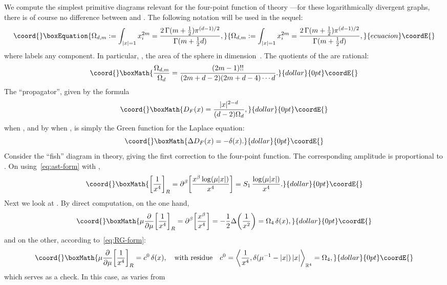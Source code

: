 \documentclass[a4paper,12pt]{article}
\renewcommand{\b}{\beta}           %
\providecommand{\Dl}{\Delta}           %
\providecommand{\del}{\partial}        %
\providecommand{\dl}{\delta}           %
\providecommand{\Ga}{\Gamma}           %
\providecommand{\R}{\mathbb{R}}        %
\providecommand{\thalf}{\tfrac{1}{2}}  %
\providecommand{\7}{\dagger}           %
\theoremstyle{plain}
\theoremstyle{definition}
\begin{document}
We compute the simplest primitive diagrams relevant for the four-point
function of \coordHE{} theory ---for these logarithmically divergent
graphs, there is of course no difference between \coordHE{} and \coordHE{}. The
following notation will be used in the sequel:
\begin{equation}\coord{}\boxEquation{
\Omega_{d,m} := \int_{|x|=1} x_i^{2m} =
\frac{2\,\Ga(m+\thalf)\pi^{(d-1)/2}}{\Ga(m+\thalf d)},
\label{eq:Om-eq}
}{
\Omega_{d,m} := \int_{|x|=1} x_i^{2m} =
\frac{2\,\Ga(m+\thalf)\pi^{(d-1)/2}}{\Ga(m+\thalf d)},
}{ecuacion}\coordE{}\end{equation}
where \coordHE{} labels any component. In particular,
\coordHE{}, the area of the sphere in dimension~\coordHE{}.
The quotients of the \coordHE{} are rational:
$$\coord{}\boxMath{
\frac{\Omega_{d,m}}{\Omega_d} =
\frac{(2m-1)!!}{(2m+d-2)(2m+d-4)\cdots d}.
}{dollar}{0pt}\coordE{}$$
The ``propagator'', given by the formula
$$\coord{}\boxMath{
D_F(x) = \frac{|x|^{2-d}}{(d-2)\Omega_d},
}{dollar}{0pt}\coordE{}$$
when \coordHE{}, and by \coordHE{} when \coordHE{}, is
simply the Green function for the Laplace equation:
$$\coord{}\boxMath{
\Dl D_F(x) = -\dl(x).
}{dollar}{0pt}\coordE{}$$
Consider the ``fish'' diagram in \coordHE{} theory, giving the
first correction to the four-point function. The corresponding
amplitude is proportional to \coordHE{}. On using~\eqref{eq:ast-form}
with \coordHE{},
$$\coord{}\boxMath{
\biggl[ \frac{1}{x^4} \biggr]_R =
\del^\b \biggl[ \frac{x^\b\log(\mu|x|)}{x^4} \biggr]
= S_1\, \frac{\log(\mu|x|)}{x^4}.
}{dollar}{0pt}\coordE{}$$
Next we look at \myHighlight{$\mu\frac{\del}{\del\mu}\bigl(T_\mu D_F^2\bigr)$}\coordHE{}. By
direct computation, on the one hand,
$$\coord{}\boxMath{
\mu\frac{\del}{\del\mu} \biggl[ \frac{1}{x^4} \biggr]_R =
\del^\b \biggl[ \frac{x^\b}{x^4} \biggr] =
- \frac{1}{2} \Dl\biggl( \frac{1}{x^2} \biggr) = \Omega_4\,\dl(x),
}{dollar}{0pt}\coordE{}$$
and on the other, according to~\eqref{eq:RG-form}:
$$\coord{}\boxMath{
\mu\frac{\del}{\del\mu} \biggl[ \frac{1}{x^4} \biggr]_R = c^0\,\dl(x),
\quad\mbox{with residue}\quad
c^0 = \biggl< \frac{1}{x^4}, \dl(\mu^{-1} - |x|)\,|x| \biggr>_{\R^4}
= \Omega_4,
}{dollar}{0pt}\coordE{}$$
which serves as a check. In this case, as \myHighlight{$\mu$}\coordHE{} varies from \coordHE{}
\end{document}
